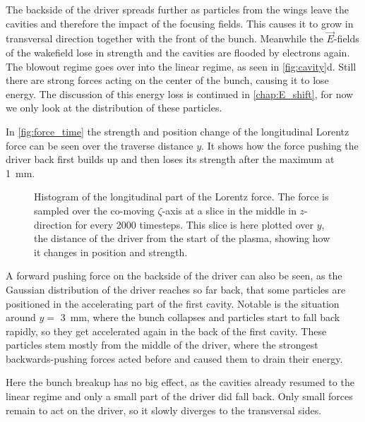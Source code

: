 \documentclass[bachelor_thesis]{subfiles}
\begin{document}
The backside of the driver spreads further as particles from the wings leave the cavities and therefore the impact of the focusing fields. This causes it to grow in transversal direction together with the front of the bunch. 
Meanwhile the $\vec{E}$-fields of the wakefield lose in strength and the cavities are flooded by electrons again. The blowout regime goes over into the linear regime, as seen in \autoref{fig:cavity}d.
Still there are strong forces acting on the center of the bunch, causing it to lose energy. The discussion of this energy loss is continued in \autoref{chap:E_shift}, for now we only look at the distribution of these particles.

In \autoref{fig:force_time} the strength and position change of the longitudinal Lorentz force can be seen over the traverse distance $y$. It shows how the force pushing the driver back first builds up and then loses its strength after the maximum at \qty{1}{\mm}.
\begin{figure}
	\centering
	
	\caption{Histogram of the longitudinal part of the Lorentz force. The force is sampled over the co-moving $\zeta$-axis at a slice in the middle in $z$-direction for every 2000 timesteps. This slice is here plotted over $y$, the distance of the driver from the start of the plasma, showing how it changes in position and strength.}
	\label{fig:force_time}
\end{figure}
A forward pushing force on the backside of the driver can also be seen, as the Gaussian distribution of the driver reaches so far back, that some particles are positioned in the accelerating part of the first cavity.
Notable is the situation around $y=$ \qty{3}{mm}, where the bunch collapses and particles start to fall back rapidly, so they get accelerated again in the back of the first cavity. These particles stem mostly from the middle of the driver,
where the strongest backwards-pushing forces acted before and caused them to drain their energy. 

Here the bunch breakup has no big effect, as the cavities already resumed to the linear regime and only a small part of the driver did fall back. Only small forces remain to act on the driver, so it slowly diverges to the transversal sides.
\end{document}
